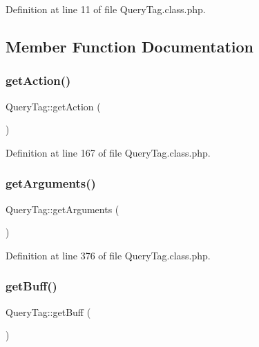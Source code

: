 Definition at line 11 of file Query\+Tag.\+class.\+php.



\subsection{Member Function Documentation}
\hypertarget{classQueryTag_aee7e1d09d7e7dbb192989c8011160a9c}{}\label{classQueryTag_aee7e1d09d7e7dbb192989c8011160a9c} 
\subsubsection{\texorpdfstring{get\+Action()}{getAction()}}
{\footnotesize\ttfamily Query\+Tag\+::get\+Action (\begin{DoxyParamCaption}{ }\end{DoxyParamCaption})}



Definition at line 167 of file Query\+Tag.\+class.\+php.

\hypertarget{classQueryTag_a96fe5aa277e258437e33b5420ab70eac}{}\label{classQueryTag_a96fe5aa277e258437e33b5420ab70eac} 
\subsubsection{\texorpdfstring{get\+Arguments()}{getArguments()}}
{\footnotesize\ttfamily Query\+Tag\+::get\+Arguments (\begin{DoxyParamCaption}{ }\end{DoxyParamCaption})}



Definition at line 376 of file Query\+Tag.\+class.\+php.

\hypertarget{classQueryTag_a15d995debc8f428419731182b9df6205}{}\label{classQueryTag_a15d995debc8f428419731182b9df6205} 
\subsubsection{\texorpdfstring{get\+Buff()}{getBuff()}}
{\footnotesize\ttfamily Query\+Tag\+::get\+Buff (\begin{DoxyParamCaption}{ }\end{DoxyParamCaption})}



